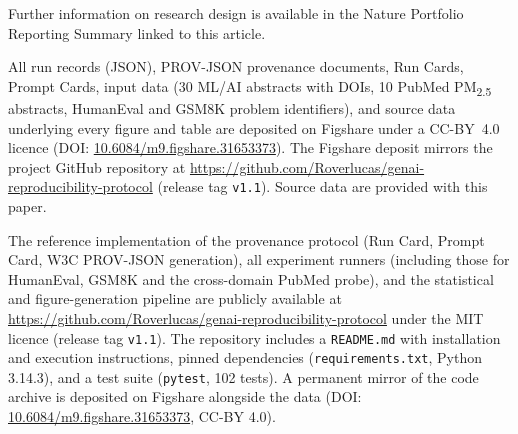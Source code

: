 \documentclass[sn-nature]{sn-jnl}
\begin{document}
Further information on research design is available in the Nature Portfolio Reporting Summary linked to this article.


\backmatter


All run records (JSON), PROV-JSON provenance documents, Run Cards, Prompt Cards, input data (30 ML/AI abstracts with DOIs, 10 PubMed PM\textsubscript{2.5} abstracts, HumanEval and GSM8K problem identifiers), and source data underlying every figure and table are deposited on Figshare under a CC-BY~4.0 licence (DOI: \href{https://doi.org/10.6084/m9.figshare.31653373}{10.6084/m9.figshare.31653373}). The Figshare deposit mirrors the project GitHub repository at \url{https://github.com/Roverlucas/genai-reproducibility-protocol} (release tag \texttt{v1.1}). Source data are provided with this paper.


The reference implementation of the provenance protocol (Run Card, Prompt Card, W3C PROV-JSON generation), all experiment runners (including those for HumanEval, GSM8K and the cross-domain PubMed probe), and the statistical and figure-generation pipeline are publicly available at \url{https://github.com/Roverlucas/genai-reproducibility-protocol} under the MIT licence (release tag \texttt{v1.1}). The repository includes a \texttt{README.md} with installation and execution instructions, pinned dependencies (\texttt{requirements.txt}, Python 3.14.3), and a test suite (\texttt{pytest}, 102 tests). A permanent mirror of the code archive is deposited on Figshare alongside the data (DOI: \href{https://doi.org/10.6084/m9.figshare.31653373}{10.6084/m9.figshare.31653373}, CC-BY 4.0).

\end{document}
